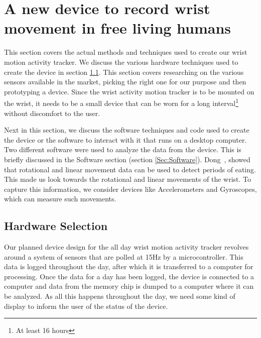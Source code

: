\chapter{A new device to record wrist movement in free living humans}
\label{Chap:Methods}
This section covers the actual methods and techniques used to create our wrist 
motion activity tracker. We discuss the various hardware techniques used to 
create the device in section \ref{Sec:Hardware}.
This section covers researching on the various sensors available in the market,
picking the right one for our purpose and then prototyping a device.
Since the wrist activity motion tracker is to be mounted on the wrist, it needs
to be a small device that can be worn for a long interval\footnote{At least
16 hours} without discomfort to the user.%

Next in this section, we discuss the software techniques and code
used to create the device or the software to interact with it that runs on a desktop computer.
Two different software were used to analyze the data from the device.
This is briefly discussed in the Software section (section \ref{Sec:Software}).
Dong~\cite{dong2013detecting}, showed that rotational and linear movement data can be used to detect
periods of eating. This made us look towards the rotational and linear movements of the wrist.
To capture this information, we consider devices like Accelerometers and Gyroscopes, which can measure such movements.

\section{Hardware Selection}
\label{Sec:Hardware}
Our planned device design for the all day wrist motion activity tracker revolves around a system of sensors that are polled at 15Hz by a microcontroller. This data is logged throughout the day, after which it is transferred to a computer for processing. Once the data for a day has been logged, the device is connected to a computer and data from the memory chip is dumped to a computer where it can be analyzed. As all this happens throughout the day, we need some kind of display to inform the user of the status of the device.

